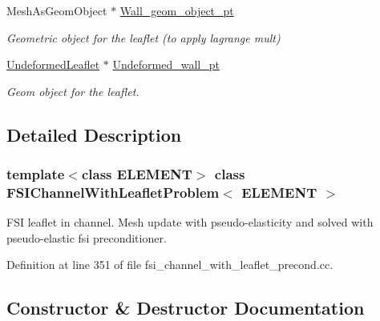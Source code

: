\begin{DoxyCompactItemize}
Mesh\+As\+Geom\+Object $\ast$ \hyperlink{classFSIChannelWithLeafletProblem_a2c6f28af7e78288f5b6d60f69036c8ee}{Wall\+\_\+geom\+\_\+object\+\_\+pt}
\begin{DoxyCompactList}\small\item\em Geometric object for the leaflet (to apply lagrange mult) \end{DoxyCompactList}\item 
\hyperlink{classUndeformedLeaflet}{Undeformed\+Leaflet} $\ast$ \hyperlink{classFSIChannelWithLeafletProblem_adb1d2ebc1379fac8b99cc61379d2b211}{Undeformed\+\_\+wall\+\_\+pt}
\begin{DoxyCompactList}\small\item\em Geom object for the leaflet. \end{DoxyCompactList}\end{DoxyCompactItemize}


\subsection{Detailed Description}
\subsubsection*{template$<$class E\+L\+E\+M\+E\+NT$>$\newline
class F\+S\+I\+Channel\+With\+Leaflet\+Problem$<$ E\+L\+E\+M\+E\+N\+T $>$}

F\+SI leaflet in channel. Mesh update with pseudo-\/elasticity and solved with pseudo-\/elastic fsi preconditioner. 

Definition at line 351 of file fsi\+\_\+channel\+\_\+with\+\_\+leaflet\+\_\+precond.\+cc.



\subsection{Constructor \& Destructor Documentation}
\mbox{\label{classFSIChannelWithLeafletProblem_a886599acf388d3ad5a2ec8c418c77280}} 
